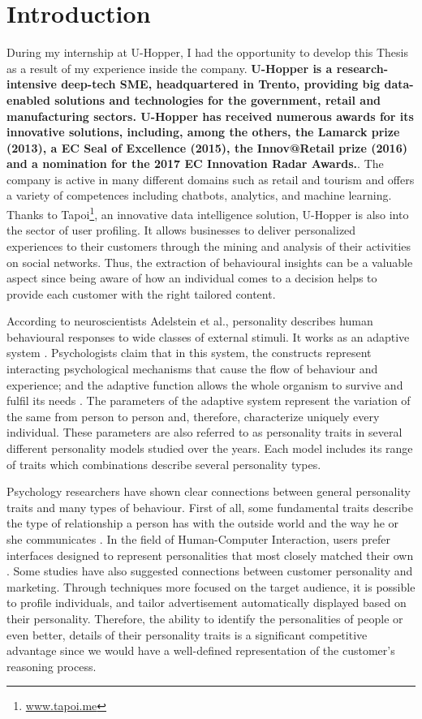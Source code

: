 \chapter{Introduction}
During my internship at U-Hopper, I had the opportunity to develop this Thesis as a result of my experience inside the company. 
\textbf{ U-Hopper is a research-intensive deep-tech SME, headquartered in Trento, providing big data-enabled solutions and technologies for the government, retail and manufacturing sectors. U-Hopper has received numerous awards for its innovative solutions, including, among the others, the Lamarck prize (2013), a EC Seal of Excellence (2015), the Innov@Retail prize (2016) and a nomination for the 2017 EC Innovation Radar Awards.}.
The company is active in many different domains such as retail and tourism and offers a variety of competences including chatbots, analytics, and machine learning.
Thanks to Tapoi\footnote{\url{www.tapoi.me}}, an innovative data intelligence solution, U-Hopper is also into the sector of user profiling.
It allows businesses to deliver personalized experiences to their customers through the mining and analysis of their activities on social networks.
Thus, the extraction of behavioural insights can be a valuable aspect since being aware of how an individual comes to a decision helps to provide each customer with the right tailored content.

According to neuroscientists Adelstein et al., personality describes human behavioural responses to wide classes of external stimuli. It works as an adaptive system \cite{adelstein2011personality}.
Psychologists claim that in this system, the constructs represent interacting psychological mechanisms that cause the flow of behaviour and experience; and the adaptive function allows the whole organism to survive and fulfil its needs \cite{deyoung2010toward}.
The parameters of the adaptive system represent the variation of the same from person to person and, therefore, characterize uniquely every individual. These parameters are also referred to as personality traits in several different personality models studied over the years.
Each model includes its range of traits which combinations describe several personality types.

Psychology researchers have shown clear connections between general personality traits and many types of behaviour.
First of all, some fundamental traits describe the type of relationship a person has with the outside world and the way he or she communicates \cite{lima2016predicting}.
In the field of Human-Computer Interaction, users prefer interfaces designed to represent personalities that most closely matched their own \cite{nass2000does}.
Some studies have also suggested connections between customer personality and marketing. Through techniques more focused on the target audience, it is possible to profile individuals, and tailor advertisement automatically displayed based on their personality.\cite{bachrach2012personality}
Therefore, the ability to identify the personalities of people or even better, details of their personality traits is a significant competitive advantage since
we would have a well-defined representation of the customer's reasoning process.

